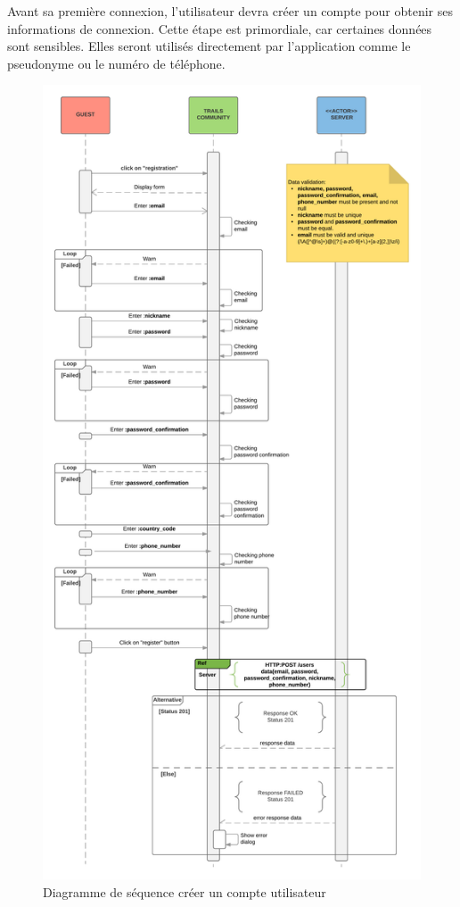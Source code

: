 \documentclass[titlepage, 12pt]{report}
\begin{document}
Avant sa première connexion, l'utilisateur devra créer un compte pour obtenir ses informations de connexion. Cette étape est primordiale, car certaines données sont sensibles. Elles seront utilisés directement par l'application comme le pseudonyme ou le numéro de téléphone.


\begin{figure}[!h]
\caption{Diagramme de séquence créer un compte utilisateur}
\label{register_sequence_diagram}
\centering
\includegraphics[scale=0.12]{Images/diagram/registration_sequence_diagram.png}
\end{figure}
\end{document}
